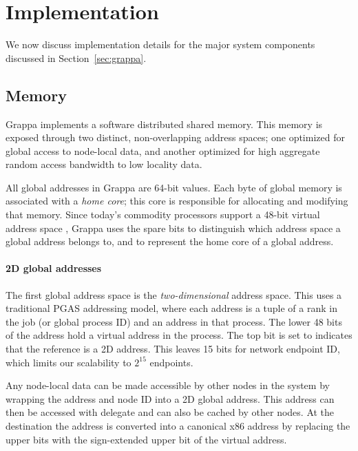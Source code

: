 \section{Implementation} \label{sec:implementation}

We now discuss implementation details for the major system components discussed in Section~\ref{sec:grappa}.

\subsection{Memory}

Grappa implements a software distributed shared memory. This memory is exposed
through two distinct, non-overlapping address spaces; one optimized for global
access to node-local data, and another optimized for high aggregate random
access bandwidth to low locality data.

All global addresses in Grappa are 64-bit
values. Each byte of global memory is associated with a {\em home core}; this
core is responsible for allocating and modifying that memory. Since today's
commodity processors support a 48-bit virtual address space ,
Grappa uses the spare bits to distinguish which address space a global address
belongs to, and to represent the home core of a global address.

\paragraph{2D global addresses} The first global address space is the {\em
two-dimensional} address space. This uses a traditional PGAS addressing model,
where each address is a tuple of a rank in the job (or global process ID) and
an address in that process. The lower 48 bits of the address hold a virtual
address in the process. The top bit is set to indicates that the reference is
a 2D address. This leaves 15 bits for network endpoint ID, which limits our
scalability to $2^15$ endpoints.

Any node-local data can be made accessible by other nodes in the system by
wrapping the address and node ID into a 2D global address. This address can
then be accessed with delegate and can also be cached by other nodes. At the
destination the address is converted into a canonical x86 address by replacing
the upper bits with the sign-extended upper bit of the virtual address.

